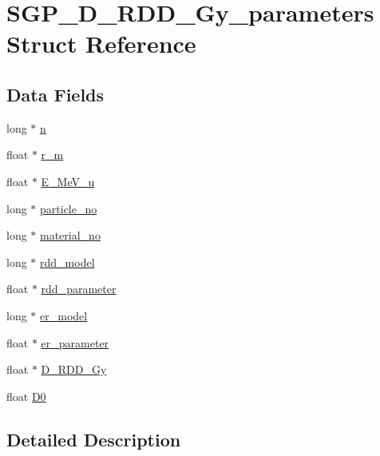 \hypertarget{structSGP__D__RDD__Gy__parameters}{
\section{SGP\_\-D\_\-RDD\_\-Gy\_\-parameters Struct Reference}
\label{d8/d35/structSGP__D__RDD__Gy__parameters}
}
\subsection*{Data Fields}
\begin{CompactItemize}
\item 
long $\ast$ \hyperlink{structSGP__D__RDD__Gy__parameters_8e6d1eeb1e3dfd2574e37f3a557f02f5}{n}
\item 
float $\ast$ \hyperlink{structSGP__D__RDD__Gy__parameters_a8aceb6c6d008a7cab1a490ad38ce886}{r\_\-m}
\item 
float $\ast$ \hyperlink{structSGP__D__RDD__Gy__parameters_4c6885f08aaf387fd45baea38a76375a}{E\_\-MeV\_\-u}
\item 
long $\ast$ \hyperlink{structSGP__D__RDD__Gy__parameters_7f85be3a87f0c96ce67a8db351a0cd3f}{particle\_\-no}
\item 
long $\ast$ \hyperlink{structSGP__D__RDD__Gy__parameters_dcf05469ee1093193db8ad9875980f4f}{material\_\-no}
\item 
long $\ast$ \hyperlink{structSGP__D__RDD__Gy__parameters_d16ad0b3ee2a1cfd146a2cc1995ba027}{rdd\_\-model}
\item 
float $\ast$ \hyperlink{structSGP__D__RDD__Gy__parameters_622064de17dd34e1f55b17d56950b038}{rdd\_\-parameter}
\item 
long $\ast$ \hyperlink{structSGP__D__RDD__Gy__parameters_278bc39a6980a87225b119aea9131307}{er\_\-model}
\item 
float $\ast$ \hyperlink{structSGP__D__RDD__Gy__parameters_5a01bc9322a4692308f137df0710b9b6}{er\_\-parameter}
\item 
float $\ast$ \hyperlink{structSGP__D__RDD__Gy__parameters_07304a50cb2cd6847b2bc4eeaddb1682}{D\_\-RDD\_\-Gy}
\item 
float \hyperlink{structSGP__D__RDD__Gy__parameters_2d283032cbcd5b341efcb4206bb2f19b}{D0}
\end{CompactItemize}


\subsection{Detailed Description}



